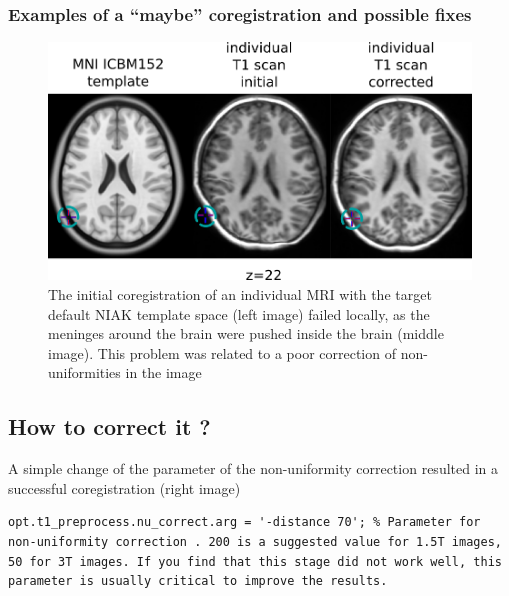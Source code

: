 \documentclass[12pt]{paper}%
\begin{document}
\subsubsection{Examples of a ``maybe'' coregistration and possible fixes}
\begin{figure}[h!tbp]
\begin{center}
\includegraphics[width=0.4 \linewidth]{fig_improve_qc}
\end{center}
\caption{
{The initial coregistration of an individual MRI with the target default NIAK template space (left image) failed locally, as the meninges around the brain were pushed inside the brain (middle image). This problem was related to a poor correction of non-uniformities in the image}
}
\label{fig_improve_qc}
\end{figure}
\subsection*{How to correct it ?}
A simple change of the parameter of the non-uniformity correction resulted in a successful coregistration (right image)

\lstset{language=matlab}
\begin{lstlisting}
opt.t1_preprocess.nu_correct.arg = '-distance 70'; % Parameter for non-uniformity correction . 200 is a suggested value for 1.5T images, 50 for 3T images. If you find that this stage did not work well, this parameter is usually critical to improve the results.
\end{lstlisting}
\newpage
\end{document}

